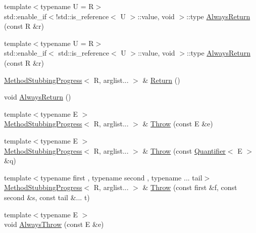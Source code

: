 \begin{DoxyCompactItemize}
\item 
{\footnotesize template$<$typename U  = R$>$ }\\std\+::enable\+\_\+if$<$!std\+::is\+\_\+reference$<$ U $>$\+::value, void $>$\+::type \mbox{\hyperlink{structfakeit_1_1MethodStubbingProgress_a268ca122b518c0a34e80535d8f457549}{Always\+Return}} (const R \&r)
\item 
{\footnotesize template$<$typename U  = R$>$ }\\std\+::enable\+\_\+if$<$ std\+::is\+\_\+reference$<$ U $>$\+::value, void $>$\+::type \mbox{\hyperlink{structfakeit_1_1MethodStubbingProgress_a84cf6a4bf307cf8d49efb69b014e9b11}{Always\+Return}} (const R \&r)
\item 
\mbox{\hyperlink{structfakeit_1_1MethodStubbingProgress}{Method\+Stubbing\+Progress}}$<$ R, arglist... $>$ \& \mbox{\hyperlink{structfakeit_1_1MethodStubbingProgress_a4743b7e25e98cd6a2be2c03b7a9416d4}{Return}} ()
\item 
void \mbox{\hyperlink{structfakeit_1_1MethodStubbingProgress_a3f1ecf87f8c73b7f3276786914579f8b}{Always\+Return}} ()
\item 
{\footnotesize template$<$typename E $>$ }\\\mbox{\hyperlink{structfakeit_1_1MethodStubbingProgress}{Method\+Stubbing\+Progress}}$<$ R, arglist... $>$ \& \mbox{\hyperlink{structfakeit_1_1MethodStubbingProgress_ae3da30d02ba5de4bfa82f51bba5602c3}{Throw}} (const E \&e)
\item 
{\footnotesize template$<$typename E $>$ }\\\mbox{\hyperlink{structfakeit_1_1MethodStubbingProgress}{Method\+Stubbing\+Progress}}$<$ R, arglist... $>$ \& \mbox{\hyperlink{structfakeit_1_1MethodStubbingProgress_a93c74210adfc0ec4662aff15f78834c7}{Throw}} (const \mbox{\hyperlink{structfakeit_1_1Quantifier}{Quantifier}}$<$ E $>$ \&q)
\item 
{\footnotesize template$<$typename first , typename second , typename ... tail$>$ }\\\mbox{\hyperlink{structfakeit_1_1MethodStubbingProgress}{Method\+Stubbing\+Progress}}$<$ R, arglist... $>$ \& \mbox{\hyperlink{structfakeit_1_1MethodStubbingProgress_a516a0ade529c61e4ab6df1bf47f3f1b2}{Throw}} (const first \&f, const second \&s, const tail \&... t)
\item 
{\footnotesize template$<$typename E $>$ }\\void \mbox{\hyperlink{structfakeit_1_1MethodStubbingProgress_a4efb736b0529123d9c5ed87630e11ac2}{Always\+Throw}} (const E \&e)
\item 

\end{DoxyCompactItemize}
